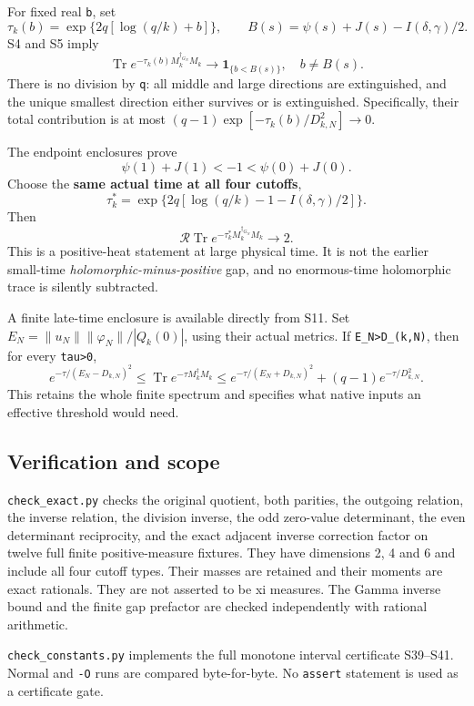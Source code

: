 \documentclass[11pt]{article}
\begin{document}
For fixed real \texttt{b}, set \[
 \tau_k(b)=\exp\{2q[\log(q/k)+b]\},\qquad
 B(s)=\psi(s)+J(s)-I(\delta,\gamma)/2.
\] S4 and S5 imply \[
 \boxed{\operatorname{Tr}e^{-\tau_k(b)M_k^{\dagger_{G_N}}M_k}
 \longrightarrow \mathbf1_{\{b<B(s)\}},\quad b\ne B(s).}           \tag{S42}
\] There is no division by \texttt{q}: all middle and large directions are extinguished, and the unique smallest direction either survives or is extinguished. Specifically, their total contribution is at most \((q-1)\exp[-\tau_k(b)/D_{k,N}^2]\to0\).

The endpoint enclosures prove \[
 \psi(1)+J(1)<-1<\psi(0)+J(0).
\] Choose the \textbf{same actual time at all four cutoffs}, \[
 \boxed{\tau_k^*=\exp\{2q[\log(q/k)-1-I(\delta,\gamma)/2]\}.}     \tag{S43}
\] Then \[
 \boxed{\mathcal R\operatorname{Tr}
 e^{-\tau_k^*M_k^{\dagger_{G_N}}M_k}\longrightarrow2.}             \tag{S44}
\] This is a positive-heat statement at large physical time. It is not the earlier small-time \emph{holomorphic-minus-positive} gap, and no enormous-time holomorphic trace is silently subtracted.

A finite late-time enclosure is available directly from S11. Set \(E_N=\|u_N\|\|\varphi_N\|/|Q_k(0)|\), using their actual metrics. If \texttt{E\_N\textgreater{}D\_(k,N)}, then for every \texttt{tau\textgreater{}0}, \[
 e^{-\tau/(E_N-D_{k,N})^2}
 \le \operatorname{Tr}e^{-\tau M_k^\dagger M_k}
 \le e^{-\tau/(E_N+D_{k,N})^2}
       +(q-1)e^{-\tau/D_{k,N}^2}.                                \tag{S45}
\] This retains the whole finite spectrum and specifies what native inputs an effective threshold would need.

\subsection{Verification and scope}\label{verification-and-scope}

\texttt{check\_exact.py} checks the original quotient, both parities, the outgoing relation, the inverse relation, the division inverse, the odd zero-value determinant, the even determinant reciprocity, and the exact adjacent inverse correction factor on twelve full finite positive-measure fixtures. They have dimensions 2, 4 and 6 and include all four cutoff types. Their masses are retained and their moments are exact rationals. They are not asserted to be xi measures. The Gamma inverse bound and the finite gap prefactor are checked independently with rational arithmetic.

\nolinkurl{check_constants.py} implements the full monotone interval certificate S39--S41. Normal and \texttt{-O} runs are compared byte-for-byte. No \texttt{assert} statement is used as a certificate gate.
\end{document}
